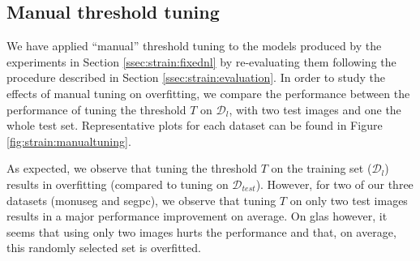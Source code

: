 \subsection{Manual threshold tuning}

We have applied ``manual'' threshold tuning to the models produced by the experiments in Section \ref{ssec:strain:fixednl} by re-evaluating them following the procedure described in Section \ref{ssec:strain:evaluation}. In order to study the effects of manual tuning on overfitting, we compare the performance between the performance of tuning the threshold $T$ on $\mathcal{D}_l$, with two test images and one the whole test set. Representative plots for each dataset can be found in Figure \ref{fig:strain:manualtuning}.

As expected, we observe that tuning the threshold $T$ on the training set ($\mathcal{D}_l$) results in overfitting (\ie compared to tuning on $\mathcal{D}_{test}$). However, for two of our three datasets (\acrshort{monuseg} and \acrshort{segpc}), we observe that tuning $T$ on only two test images results in a major performance improvement on average. On \acrshort{glas} however, it seems that using only two images hurts the performance and that, on average, this randomly selected set is overfitted. 

